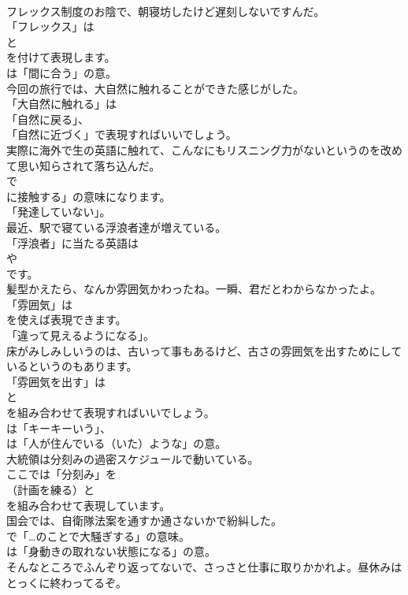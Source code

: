 \documentclass[8pt]{extreport}
\begin{document}
\begin{CJK}{UTF8}{min}
\\	フレックス制度のお陰で、朝寝坊したけど遅刻しないですんだ。 
\\	「フレックス」は
\\	と
\\	を付けて表現します。
\\	は「間に合う」の意。	
\\	今回の旅行では、大自然に触れることができた感じがした。 
\\	「大自然に触れる」は
\\	「自然に戻る」、
\\	「自然に近づく」で表現すればいいでしょう。	
\\	実際に海外で生の英語に触れて、こんなにもリスニング力がないというのを改めて思い知らされて落ち込んだ。 
\\	で
\\	に接触する」の意味になります。
\\	「発達していない」。	
\\	最近、駅で寝ている浮浪者達が増えている。 
\\	「浮浪者」に当たる英語は
\\	や
\\	です。	
\\	髪型かえたら、なんか雰囲気かわったね。一瞬、君だとわからなかったよ。 
\\	「雰囲気」は
\\	を使えば表現できます。
\\	「違って見えるようになる」。	
\\	床がみしみしいうのは、古いって事もあるけど、古さの雰囲気を出すためにしているというのもあります。 
\\	「雰囲気を出す」は 
\\	と 
\\	を組み合わせて表現すればいいでしょう。
\\	は「キーキーいう」、
\\	は「人が住んでいる（いた）ような」の意。	
\\	大統領は分刻みの過密スケジュールで動いている。 
\\	ここでは「分刻み」を 
\\	（計画を練る）と 
\\	を組み合わせて表現しています。	
\\	国会では、自衛隊法案を通すか通さないかで紛糾した。 
\\	で「…のことで大騒ぎする」の意味。
\\	は「身動きの取れない状態になる」の意。	
\\	そんなところでふんぞり返ってないで、さっさと仕事に取りかかれよ。昼休みはとっくに終わってるぞ。 

\end{CJK}
\end{document}
